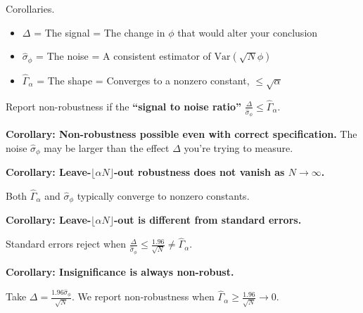 \begin{frame}{Corollaries.}
\begin{itemize}
    \item[] $\Delta$  = The signal = The change in $\phi$ that would alter your conclusion
    \item[] $\hat\sigma_\phi$ = The noise = A consistent estimator of $\mathrm{Var}(\sqrt{N}\phi)$
    \item[] $\hat\Gamma_\alpha$ = The shape = Converges to a nonzero constant, $\le \sqrt{\alpha}$
\end{itemize}

Report non-robustness if the \textbf{``signal to noise ratio''}
$\frac{\Delta}{\hat\sigma_\phi} \le \hat\Gamma_\alpha$.

\pause
\vspace{0.5em}
\textbf{Corollary:  Non-robustness possible even with correct specification.}
\vspace{-0.4em}
The noise $\hat\sigma_\phi$ may be larger than the effect
$\Delta$ you're trying to measure.

\pause
\vspace{0.5em}
\textbf{Corollary:  Leave-$\lfloor \alpha N \rfloor$-out robustness does not vanish as $N \rightarrow \infty$.}
\vspace{-0.4em}

Both $\hat\Gamma_\alpha$ and $\hat\sigma_\phi$ typically converge to nonzero constants.

\pause
\vspace{0.5em}
\textbf{Corollary:  Leave-$\lfloor \alpha N \rfloor$-out is different from standard errors.}
\vspace{-0.4em}

Standard errors reject when
$\frac{\Delta}{\hat\sigma_\phi} \le \frac{1.96}{\sqrt{N}} \ne \hat\Gamma_\alpha$.

\pause
\vspace{0.5em}
\textbf{Corollary:  Insignificance is always non-robust.}
\vspace{-0.4em}

Take $\Delta = \frac{1.96 \hat \sigma_\phi}{\sqrt{N}}$.  We report
non-robustness when $\hat\Gamma_\alpha \ge \frac{1.96}{\sqrt{N}} \rightarrow 0$.

\end{frame}




